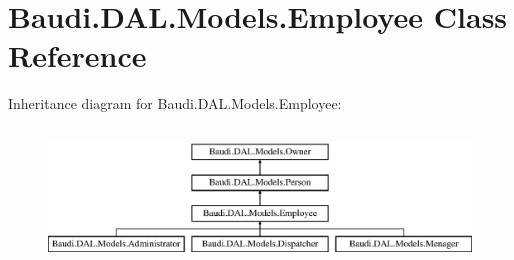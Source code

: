 \hypertarget{class_baudi_1_1_d_a_l_1_1_models_1_1_employee}{}\section{Baudi.\+D\+A\+L.\+Models.\+Employee Class Reference}
\label{class_baudi_1_1_d_a_l_1_1_models_1_1_employee}
Inheritance diagram for Baudi.\+D\+A\+L.\+Models.\+Employee\+:\begin{figure}[H]
\begin{center}
\leavevmode
\includegraphics[height=3.660131cm]{class_baudi_1_1_d_a_l_1_1_models_1_1_employee}
\end{center}
\end{figure}
